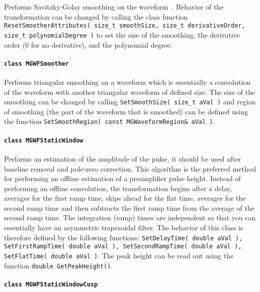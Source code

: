 Performs Savitzky-Golay smoothing on the waveform~\cite{Sav64aa}.  
Behavior of the transformation can be changed by calling the class function \lstinline!ResetSmootherAttributes( size_t smoothSize, size_t derivativeOrder, size_t polynomialDegree )! to set the size of the smoothing, the derivative order (0 for no derivative), and the polynomial degree.  

			\paragraph{\lstinline!class MGWFSmoother!} 

Performs triangular smoothing on a waveform which is essentially a convolution of the waveform with another triangular waveform of defined size.  The size of the smoothing can be changed by calling \lstinline!SetSmoothSize( size_t aVal )! and region of smoothing (the part of the waveform that is smoothed) can be defined using the function \lstinline!SetSmoothRegion( const MGWaveformRegion& aVal )!.  

			\paragraph{\lstinline!class MGWFStaticWindow!}
Performs an estimation of the amplitude of the pulse, it should be used after baseline removal and pole-zero correction.  This algorithm is the preferred method for performing an offline estimation of a preamplifier pulse height.  Instead of performing an offline convolution, the transformation begins after a delay, averages for the first ramp time, skips ahead for the flat time, averages for the second ramp time and then subtracts the first ramp time from the average of the second ramp time.  The integration (ramp) times are independent so that you can essentially have an asymmetric trapezoidal filter.  The behavior of this class is therefore defined by the following functions: \lstinline!SetDelayTime( double aVal ), SetFirstRampTime( double aVal ), SetSecondRampTime( double aVal ), SetFlatTime( double aVal )!.  The peak height can be read out using the function \lstinline!double GetPeakHeight()!.
			\paragraph{\lstinline!class MGWFStaticWindowCusp!} 

